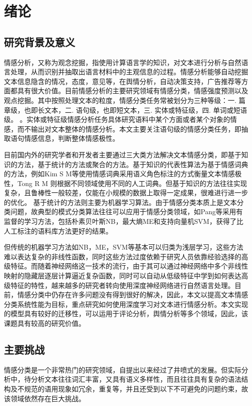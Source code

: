 \chapter{绪论}\thispagestyle{fancy}

\section{研究背景及意义}
情感分析，又称为观念挖掘，指使用计算语言学的知识，对文本进行分析与自然语言处理，从而识别并抽取出语言材料中的主观信息的过程\cite{Tejwani2014}。情感分析能够自动挖掘文本信息隐含的情况，态度，意见等，在舆情分析，自动决策支持，广告推荐等方面都具有很大价值\cite{Zhang2016}。目前情感分析的主要研究领域有情感分类，情感强度预测以及观点挖掘\cite{Tejwani2014}。其中按照处理文本的粒度，情感分类任务常被划分为三种等级：一. 篇章级，也即长文本，二. 语句级，也即短文本，三. 实体或特征级，四. 单词或短语级。\cite{Zhang2016} \cite{Liu2016} \cite{Zhao2010}。实体或特征级情感分析任务具体研究语料中某个方面或者某个对象的情感，而不输出对文本整体的情感分析。本文主要关注语句级的情感分类任务，即抽取语句情感信息，判断整体情感极性。

目前国内外的研究学者和开发者主要通过三大类方法解决文本情感分类，即基于知识的方法，基于统计的方法或聚合的方法\cite{Zong2013}。基于知识的代表性算法为基于情感词典的方法，例如Kim S M等\cite{Kim2006}使用情感词典采用语义角色标注的方式衡量文本情感极性，Tong R M \cite{Tong2001}则根据不同领域使用不同的人工词典。但基于知识的方法往往实现复杂，且鲁棒性一般较差，仅能在小规模的数据上取得一定成果，很难进行进一步的优化\cite{Zong2013}。
基于统计的方法则主要为机器学习算法。由于情感分类本质上是文本分类问题，故典型的模式分类算法往往可以应用于情感分类领域，如Pang等\cite{bopang2002}采用有监督的学习方法，包括朴素贝叶斯NB，最大熵ME和支持向量机SVM，获得了比人工标注的语料库方法更好的结果。

但传统的机器学习方法如NB，ME，SVM等基本可以归类为浅层学习，这些方法难以表达复杂的非线性函数，同时这些方法过度依赖于研究人员依靠经验选择的高级特征。而随着神经网络这一技术的流行，由于其可以通过神经网络中多个非线性映射的隐藏层逐层计算逼近复杂函数，同时可以自动从低级特征中学到如何表达高级特征的特性，越来越多的研究者转向使用深度神经网络进行自然语言处理。目前，情感分类中仍存在许多问题没有得到很好的解决，因此，本文以提高文本情感分类系统性能为目标，重点研究如何使用深度学习对文本进行情感分析。本文实现的模型具有较好的迁移性，可以运用于评论分析，舆情分析等多个领域，因此，该课题具有较高的研究价值。
\section{主要挑战}
情感分类是一个非常热门的研究领域，自提出以来经过了井喷式的发展\cite{Liu2016}。但实际分析中，待分析文本往往词汇丰富，又具有语义多样性，而且往往具有复杂的语法结构及不规范的语用现象如冗余，重复等\cite{Zong2013}，并且还受到以下不可避免的问题约束，故该领域依然存在巨大挑战。
